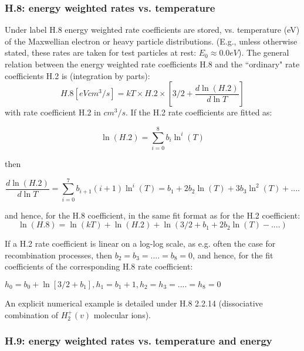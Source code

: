 \documentclass[12pt,dvipdfmx]{article}
\begin{document}
\subsubsection{H.8: energy weighted rates vs. temperature}\label{sec1.3.8}
Under label H.8 energy weighted rate coefficients are stored, vs. temperature (eV) of the
Maxwellian electron or heavy particle distributions.
(E.g., unless otherwise stated, these rates are taken for test particles at rest: $E_0 \approx 0.0 eV$).
The general relation between the energy weighted rate coefficients
H.8 and the ``ordinary" rate coefficients H.2
is (integration by parts):
\begin{equation}
H.8 [eV cm^3/s]= kT \times H.2 \times \left[3/2+\frac{d \ln(H.2)}{d \ln T}\right]
\end{equation}
with rate coefficient H.2 in $cm^3/s$.
If the H.2 rate coefficients are fitted as:

\begin{equation}
\ln(H.2) = \sum_{i=0}^8  b_i \ln^i(T)
\end{equation}

then

\begin{equation}
\frac{d \ln(H.2)}{d \ln T}= \sum_{i=0}^7  b_{i+1} (i+1)  \ln^i(T) = b_1 + 2b_2 \ln(T) + 3b_3 \ln^2(T) + ....
\end{equation}

and hence, for the  H.8 coefficient, in the same fit format as for the H.2 coefficient:
\begin{equation}
\ln(H.8) = \ln(kT) +  \ln(H.2) + \ln(3/2 + b_1 + 2b_2 \ln(T) - ....)
\end{equation}

If a H.2 rate coefficient is linear on a log-log scale, as e.g. often the case for recombination processes, then
$b_2 =b_3 =....=b_8 = 0$, and hence, for the fit coefficients of the corresponding H.8 rate coefficient:

$h_0=b_0 + \ln [3/2 + b_1],  h_1=b_1+1,  h_2 = h_3 = ....=h_8 = 0$

An explicit numerical example is detailed under H.8 2.2.14 (dissociative combination of $H_2^+(v)$ molecular ions).




\subsubsection{H.9: energy weighted rates vs. temperature and energy}\label{sec1.3.9}
\end{document}
